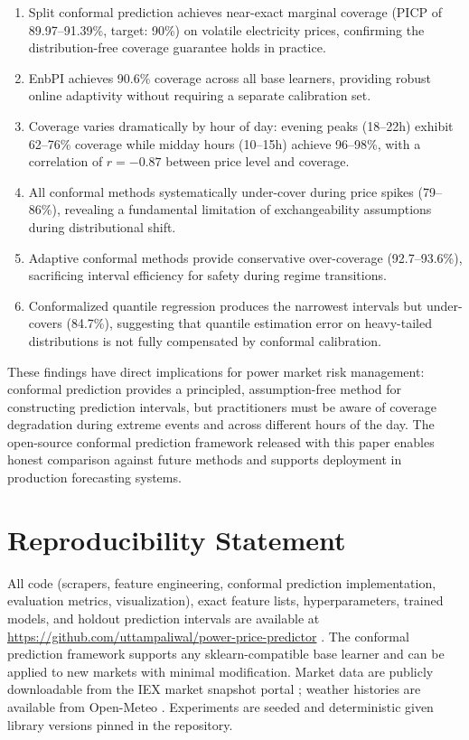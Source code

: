 \documentclass[preprint,12pt]{elsarticle}
\begin{document}
\begin{enumerate}
\begin{enumerate}
  \item Split conformal prediction achieves near-exact marginal coverage (PICP of 89.97--91.39\%, target: 90\%) on volatile electricity prices, confirming the distribution-free coverage guarantee holds in practice.
  \item EnbPI achieves 90.6\% coverage across all base learners, providing robust online adaptivity without requiring a separate calibration set.
  \item Coverage varies dramatically by hour of day: evening peaks (18--22h) exhibit 62--76\% coverage while midday hours (10--15h) achieve 96--98\%, with a correlation of $r = -0.87$ between price level and coverage.
  \item All conformal methods systematically under-cover during price spikes (79--86\%), revealing a fundamental limitation of exchangeability assumptions during distributional shift.
  \item Adaptive conformal methods provide conservative over-coverage (92.7--93.6\%), sacrificing interval efficiency for safety during regime transitions.
  \item Conformalized quantile regression produces the narrowest intervals but under-covers (84.7\%), suggesting that quantile estimation error on heavy-tailed distributions is not fully compensated by conformal calibration.
\end{enumerate}

These findings have direct implications for power market risk management: conformal prediction provides a principled, assumption-free method for constructing prediction intervals, but practitioners must be aware of coverage degradation during extreme events and across different hours of the day. The open-source conformal prediction framework released with this paper enables honest comparison against future methods and supports deployment in production forecasting systems.

\section*{Reproducibility Statement}
All code (scrapers, feature engineering, conformal prediction implementation, evaluation metrics, visualization), exact feature lists, hyperparameters, trained models, and holdout prediction intervals are available at \url{https://github.com/uttampaliwal/power-price-predictor} \citep{repo}. The conformal prediction framework supports any sklearn-compatible base learner and can be applied to new markets with minimal modification. Market data are publicly downloadable from the IEX market snapshot portal \citep{iexdata}; weather histories are available from Open-Meteo \citep{openmeteo}. Experiments are seeded and deterministic given library versions pinned in the repository.


\end{enumerate}
\end{document}
